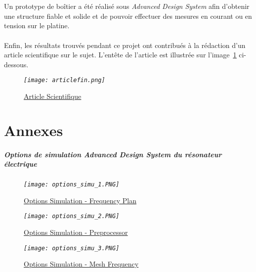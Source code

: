 \documentclass[12pt,fleqn]{book} %
\begin{document}
~\\\\Un prototype de boîtier a été réalisé sous \emph{Advanced Design System} afin d'obtenir une structure fiable et solide et de pouvoir effectuer des mesures en courant ou en tension sur le platine.
~\\\\Enfin, les résultats trouvés pendant ce projet ont contribués à la rédaction d'un article scientifique sur le sujet. L'entête de l'article est illustrée sur l'image~\underline{\color{blue}\ref{articlefin}} ci-dessous. 
\begin{figure}[H]
	\centering
	\itshape
	\texttt{[image: articlefin.png]}
	\caption{\label{articlefin} \underline{Article Scientifique}}
\end{figure}

\setcounter{part}{-4}
\part{Annexes}
\subsubsection{Options de simulation Advanced Design System du résonateur électrique}
\begin{figure}[H]
	\centering
	\itshape
	\texttt{[image: options\_simu\_1.PNG]}
	\caption{\label{opt1} \underline{Options Simulation - Frequency Plan}}
\end{figure}
\begin{figure}[H]
	\centering
	\itshape
	\texttt{[image: options\_simu\_2.PNG]}
	\caption{\label{opt2} \underline{Options Simulation - Preprocessor}}
\end{figure}
\begin{figure}[H]
	\centering
	\itshape
	\texttt{[image: options\_simu\_3.PNG]}
	\caption{\label{opt3} \underline{Options Simulation - Mesh Frequency}}
\end{figure}
\setcounter{part}{-5}
\end{document}
